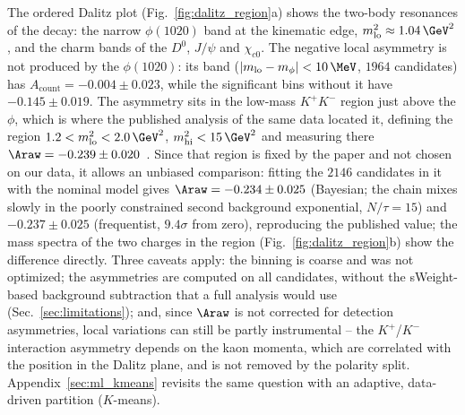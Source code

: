 The ordered Dalitz plot (Fig.~\ref{fig:dalitz_region}a) shows the two-body resonances of the decay: the narrow $\phi(1020)$ band at the kinematic edge, $m^2_{\mathrm{lo}}\approx1.04\,\GeV^2$, and the charm bands of the $D^0$, $J/\psi$ and $\chi_{c0}$. The negative local asymmetry is not produced by the $\phi(1020)$: its band ($|m_{\mathrm{lo}}-m_\phi|<10\,\MeV$, $1964$ candidates) has $A_{\mathrm{count}}=-0.004\pm0.023$, while the significant bins without it have $-0.145\pm0.019$. The asymmetry sits in the low-mass $K^+K^-$ region just above the $\phi$, which is where the published analysis of the same data located it, defining the region $1.2<m^2_{\mathrm{lo}}<2.0\,\GeV^2$, $m^2_{\mathrm{hi}}<15\,\GeV^2$ and measuring there $\Araw=-0.239\pm0.020$~\cite{lhcb_cpv_2013}. Since that region is fixed by the paper and not chosen on our data, it allows an unbiased comparison: fitting the $2146$ candidates in it with the nominal model gives $\Araw=-0.234\pm0.025$ (Bayesian; the chain mixes slowly in the poorly constrained second background exponential, $N/\tau=15$) and $-0.237\pm0.025$ (frequentist, $9.4\sigma$ from zero), reproducing the published value; the mass spectra of the two charges in the region (Fig.~\ref{fig:dalitz_region}b) show the difference directly. Three caveats apply: the binning is coarse and was not optimized; the asymmetries are computed on all candidates, without the sWeight-based background subtraction that a full analysis would use (Sec.~\ref{sec:limitations}); and, since $\Araw$ is not corrected for detection asymmetries, local variations can still be partly instrumental -- the $K^+$/$K^-$ interaction asymmetry depends on the kaon momenta, which are correlated with the position in the Dalitz plane, and is not removed by the polarity split. Appendix~\ref{sec:ml_kmeans} revisits the same question with an adaptive, data-driven partition ($K$-means).




